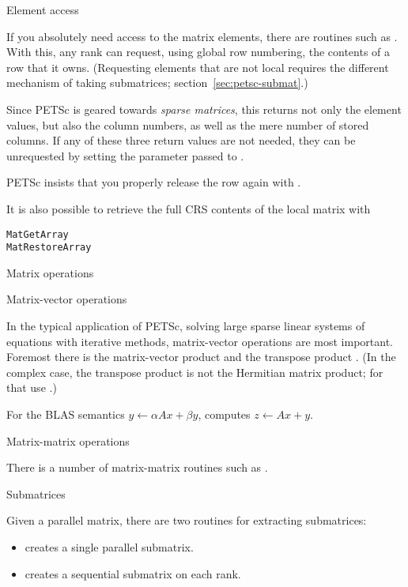  {Element access}

If you absolutely need access to the matrix elements, there are
routines such as 
.
With this, any rank can request, using global row numbering,
the contents of a row that it owns.
(Requesting elements that are not local requires the
different mechanism of taking submatrices; section~\ref{sec:petsc-submat}.)

Since PETSc is geared towards
\emph{sparse matrices},
this returns not only the element values, but also the column numbers,
as well as the mere number of stored columns.
If any of these three return values are not needed, they can be
unrequested by setting the parameter passed to .

PETSc insists that you properly release the row again with
.

It is also possible to retrieve the full \ac{CRS} contents
of the local matrix with
\begin{lstlisting}
MatGetArray
MatRestoreArray
\end{lstlisting}

 {Matrix operations}

 {Matrix-vector operations}

In the typical application of PETSc, solving large sparse linear
systems of equations with iterative methods, matrix-vector operations
are most important. Foremost there is the matrix-vector product
 and the transpose product
.
(In the complex case, the transpose product is not the Hermitian
matrix product; for that use .)

For the \ac{BLAS}  semantics
$y\leftarrow \alpha Ax + \beta y$,
 computes
$z\leftarrow Ax +y $.

 {Matrix-matrix operations}

There is a number of matrix-matrix routines such as
.

 {Submatrices}
\label{sec:petsc-submat}

Given a parallel matrix, there are two routines for extracting submatrices:
\begin{itemize}
\item {} creates a single parallel
  submatrix.
\item {} creates a sequential
  submatrix on each rank.
\end{itemize}

